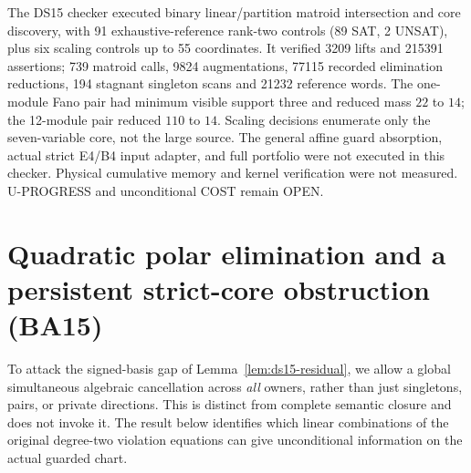 \documentclass[11pt]{article}
\begin{document}
The DS15 checker executed binary linear/partition matroid intersection and core discovery, with 91 exhaustive-reference rank-two controls (89 SAT, 2 UNSAT), plus six scaling controls up to 55 coordinates. It verified 3209 lifts and 215391 assertions; 739 matroid calls, 9824 augmentations, 77115 recorded elimination reductions, 194 stagnant singleton scans and 21232 reference words. The one-module Fano pair had minimum visible support three and reduced mass $22$ to $14$; the 12-module pair reduced $110$ to $14$. Scaling decisions enumerate only the seven-variable core, not the large source. The general affine guard absorption, actual strict E4/B4 input adapter, and full portfolio were not executed in this checker. Physical cumulative memory and kernel verification were not measured. U-PROGRESS and unconditional COST remain OPEN.


\section{Quadratic polar elimination and a persistent strict-core obstruction (BA15)}\label{sec:ba15}
To attack the signed-basis gap of Lemma~\ref{lem:ds15-residual}, we allow a global simultaneous algebraic cancellation across \emph{all} owners, rather than just singletons, pairs, or private directions. This is distinct from complete semantic closure and does not invoke it. The result below identifies which linear combinations of the original degree-two violation equations can give unconditional information on the actual guarded chart.
\end{document}
